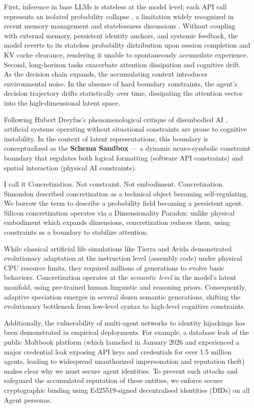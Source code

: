 \documentclass[10pt,journal,compsoc]{IEEEtran}
\begin{document}
First, inference in base LLMs is stateless at the model level; each API call represents an isolated probability collapse \cite{vaswani2017}, a limitation widely recognized in recent memory management and statelessness discussions \cite{packer2023, luo2026, zhang2024survey}. Without coupling with external memory, persistent identity anchors, and systemic feedback, the model reverts to its stateless probability distribution upon session completion and KV cache clearance, rendering it unable to spontaneously accumulate experience. Second, long-horizon tasks exacerbate attention dissipation and cognitive drift. As the decision chain expands, the accumulating context introduces environmental noise. In the absence of hard boundary constraints, the agent's decision trajectory drifts statistically over time, dissipating the attention vector into the high-dimensional latent space.

Following Hubert Dreyfus's phenomenological critique of disembodied AI \cite[p.156]{dreyfus1972}, artificial systems operating without situational constraints are prone to cognitive instability. In the context of latent representations, this boundary is conceptualized as the \textbf{Schema Sandbox} --- a dynamic neuro-symbolic constraint boundary that regulates both logical formatting (software API constraints) and spatial interaction (physical AI constraints).

I call it Concretization. Not constraint. Not embodiment. Concretization. Simondon described concretization as a technical object becoming self-regulating. We borrow the term to describe a probability field becoming a persistent agent. Silicon concretization operates via a Dimensionality Paradox: unlike physical embodiment which expands dimensions, concretization reduces them, using constraints as a boundary to stabilize attention.

While classical artificial life simulations like Tierra \cite{ray1991} and Avida \cite{ofria2004} demonstrated evolutionary adaptation at the instruction level (assembly code) under physical CPU resource limits, they required millions of generations to evolve basic behaviors. Concretization operates at the \textit{semantic level} in the model's latent manifold, using pre-trained human linguistic and reasoning priors. Consequently, adaptive speciation emerges in several dozen semantic generations, shifting the evolutionary bottleneck from low-level syntax to high-level cognitive constraints.

Additionally, the vulnerability of multi-agent networks to identity hijackings has been demonstrated in empirical deployments. For example, a database leak of the public Moltbook platform (which launched in January 2026 and experienced a major credential leak exposing API keys and credentials for over 1.5 million agents, leading to widespread unauthorized impersonation and reputation theft) makes clear why we must secure agent identities. To prevent such attacks and safeguard the accumulated reputation of these entities, we enforce secure cryptographic binding using Ed25519-signed decentralised identities (DIDs) on all Agent personas.
\end{document}
